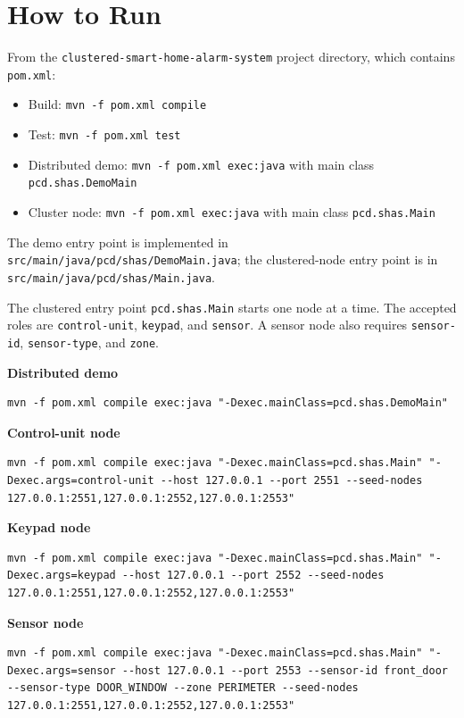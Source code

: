 \clearpage
\section{How to Run}

From the \texttt{clustered-smart-home-alarm-system} project directory, which
contains \texttt{pom.xml}:

\begin{itemize}
  \item Build: \texttt{mvn -f pom.xml compile}
  \item Test: \texttt{mvn -f pom.xml test}
  \item Distributed demo: \texttt{mvn -f pom.xml exec:java} with main class \texttt{pcd.shas.DemoMain}
  \item Cluster node: \texttt{mvn -f pom.xml exec:java} with main class \texttt{pcd.shas.Main}
\end{itemize}

The demo entry point is implemented in
\texttt{src/main/java/pcd/shas/DemoMain.java}; the clustered-node entry point
is in \texttt{src/main/java/pcd/shas/Main.java}.

The clustered entry point \texttt{pcd.shas.Main} starts one node at a time.
The accepted roles are \texttt{control-unit}, \texttt{keypad}, and
\texttt{sensor}. A sensor node also requires \texttt{sensor-id},
\texttt{sensor-type}, and \texttt{zone}.

\textbf{Distributed demo}
\begin{lstlisting}[style=terminalstyle]
mvn -f pom.xml compile exec:java "-Dexec.mainClass=pcd.shas.DemoMain"
\end{lstlisting}

\textbf{Control-unit node}
\begin{lstlisting}[style=terminalstyle]
mvn -f pom.xml compile exec:java "-Dexec.mainClass=pcd.shas.Main" "-Dexec.args=control-unit --host 127.0.0.1 --port 2551 --seed-nodes 127.0.0.1:2551,127.0.0.1:2552,127.0.0.1:2553"
\end{lstlisting}

\textbf{Keypad node}
\begin{lstlisting}[style=terminalstyle]
mvn -f pom.xml compile exec:java "-Dexec.mainClass=pcd.shas.Main" "-Dexec.args=keypad --host 127.0.0.1 --port 2552 --seed-nodes 127.0.0.1:2551,127.0.0.1:2552,127.0.0.1:2553"
\end{lstlisting}

\textbf{Sensor node}
\begin{lstlisting}[style=terminalstyle]
mvn -f pom.xml compile exec:java "-Dexec.mainClass=pcd.shas.Main" "-Dexec.args=sensor --host 127.0.0.1 --port 2553 --sensor-id front_door --sensor-type DOOR_WINDOW --zone PERIMETER --seed-nodes 127.0.0.1:2551,127.0.0.1:2552,127.0.0.1:2553"
\end{lstlisting}

